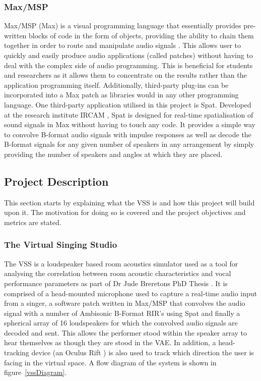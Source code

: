 \documentclass[../../main.tex]{subfiles}
\begin{document}
	\subsubsection{Max/MSP}
		Max/MSP (Max) is a visual programming language that essentially provides pre-written blocks of code in the form of objects, providing the ability to chain them together in order to route and manipulate audio signals \cite{max}. This allows user to quickly and easily produce audio applications (called patches) without having to deal with the complex side of audio programming. This is beneficial for students and researchers as it allows them to concentrate on the results rather than the application programming itself. Additionally, third-party plug-ins can be incorporated into a Max patch as libraries would in any other programming language. One third-party application utilised in this project is Spat. Developed at the research institute IRCAM \cite{spat}, Spat is designed for real-time spatialisation of sound signals in Max without having to touch any code. It provides a simple way to convolve B-format audio signals with impulse responses as well as decode the B-format signals for any given number of speakers in any arrangement by simply providing the number of speakers and angles at which they are placed.


\subsection{Project Description}
	
	This section starts by explaining what the \ac{VSS} is and how this project will build upon it. The motivation for doing so is covered and the project objectives and metrics are stated.

	\subsubsection{The Virtual Singing Studio}

		The \ac{VSS} is a loudspeaker based room acoustics simulator used as a tool for analysing the correlation between room acoustic characteristics and vocal performance parameters as part of Dr Jude Breretons PhD Thesis \cite{Brereton2014}. It is comprised of a head-mounted microphone used to capture a real-time audio input from a singer, a software patch written in Max/MSP that convolves the audio signal with a number of Ambisonic B-Format \ac{RIR}'s using Spat and finally a spherical array of 16 loudspeakers for which the convolved audio signals are decoded and sent. This allows the performer stood within the speaker array to hear themselves as though they are stood in the \ac{VAE}. In addition, a head-tracking device (an Oculus Rift \cite{oculus}) is also used to track which direction the user is facing in the virtual space. A flow diagram of the system is shown in figure~\ref{vssDiagram}.
\end{document}
